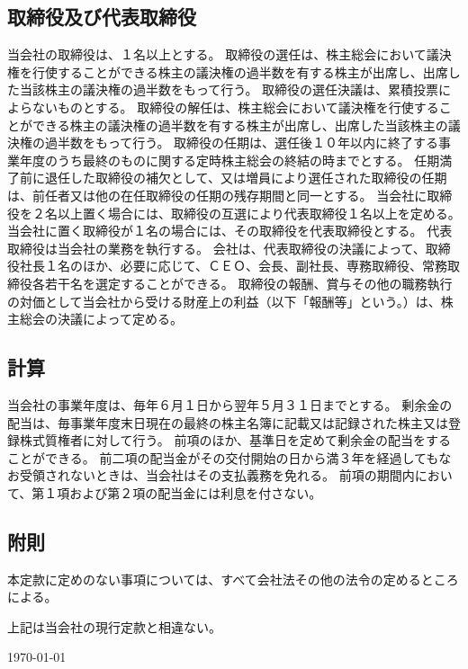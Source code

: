 \documentclass[10pt,a4paper,uplatex]{jsarticle}
\begin{document}
\subsection{取締役及び代表取締役}
当会社の取締役は、１名以上とする。
取締役の選任は、株主総会において議決権を行使することができる株主の議決権の過半数を有する株主が出席し、出席した当該株主の議決権の過半数をもって行う。
\term 取締役の選任決議は、累積投票によらないものとする。
取締役の解任は、株主総会において議決権を行使することができる株主の議決権の過半数を有する株主が出席し、出席した当該株主の議決権の過半数をもって行う。
取締役の任期は、選任後１０年以内に終了する事業年度のうち最終のものに関する定時株主総会の終結の時までとする。
\term 任期満了前に退任した取締役の補欠として、又は増員により選任された取締役の任期は、前任者又は他の在任取締役の任期の残存期間と同一とする。
当会社に取締役を２名以上置く場合には、取締役の互選により代表取締役１名以上を定める。
\term 当会社に置く取締役が１名の場合には、その取締役を代表取締役とする。
\term 代表取締役は当会社の業務を執行する。
\term 会社は、代表取締役の決議によって、取締役社長１名のほか、必要に応じて、ＣＥＯ、会長、副社長、専務取締役、常務取締役各若干名を選定することができる。
取締役の報酬、賞与その他の職務執行の対価として当会社から受ける財産上の利益（以下「報酬等」という。）は、株主総会の決議によって定める。

\subsection{計算}
当会社の事業年度は、毎年６月１日から翌年５月３１日までとする。
剰余金の配当は、毎事業年度末日現在の最終の株主名簿に記載又は記録された株主又は登録株式質権者に対して行う。
\term 前項のほか、基準日を定めて剰余金の配当をすることができる。
\term 前二項の配当金がその交付開始の日から満３年を経過してもなお受領されないときは、当会社はその支払義務を免れる。
\term 前項の期間内において、第１項および第２項の配当金には利息を付さない。

\subsection{附則}
本定款に定めのない事項については、すべて会社法その他の法令の定めるところによる。


\vspace{20pt}
上記は当会社の現行定款と相違ない。
\begin{flushleft}
\today\\
\vspace{10pt}
\MakeSignatureField
\end{flushleft}
\end{document}
